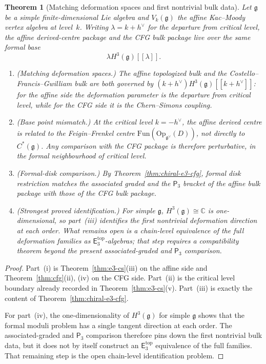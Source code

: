 \documentclass[11pt,reqno]{amsart}
\newtheorem{theorem}{Theorem}[section]
\theoremstyle{definition}
\theoremstyle{remark}
\providecommand{\Ethree}{\mathsf{E}_{3}}
\newcommand{\Pthree}{\mathsf{P}_{3}}
\newcommand{\fg}{\mathfrak{g}}
\newcommand{\CC}{\mathbb{C}}
\numberwithin{equation}{section}
\begin{document}
\begin{theorem}[Matching deformation spaces and first
nontrivial bulk data]
\label{thm:e3-identification}
Let $\fg$ be a simple finite-dimensional Lie algebra and
$V_k(\fg)$ the affine Kac--Moody vertex algebra at
level~$k$. Writing $\lambda = k + h^\vee$ for the
departure from critical level, the affine derived-centre
package and the CFG bulk package live over the same formal
base
\begin{equation}\label{eq:e3-families}
  \lambda H^3(\fg)[[\lambda]].
\end{equation}
\begin{enumerate}[label=\textup{(\roman*)}]
\item \textup{(Matching deformation spaces.)}
  The affine topologized bulk and the
  Costello--Francis--Gwilliam bulk are both governed by
  $(k+h^\vee) H^3(\fg)[[k+h^\vee]]$: for the affine side the
  deformation parameter is the departure from critical
  level, while for the CFG side it is the
  Chern--Simons coupling.
\item \textup{(Base point mismatch.)}
  At the critical level $k = -h^\vee$, the affine derived
  centre is related to the Feigin--Frenkel centre
  $\mathrm{Fun}(\mathrm{Op}_{\fg^\vee}(D))$, not directly to
  $C^*(\fg)$. Any comparison with the CFG package is
  therefore perturbative, in the formal neighbourhood of
  critical level.
\item \textup{(Formal-disk comparison.)}
  By Theorem~\textup{\ref{thm:chiral-e3-cfg}}, formal disk
  restriction matches the associated graded and the
  $\Pthree$ bracket of the affine bulk package with those of
  the CFG bulk package.
\item \textup{(Strongest proved identification.)}
  For simple $\fg$, $H^3(\fg) \cong \CC$ is one-dimensional,
  so part~\textup{(iii)} identifies the first nontrivial
  deformation direction at each order. What remains open is
  a chain-level equivalence of the full deformation
  families as $\Ethree^{\mathrm{top}}$-algebras; that step
  requires a compatibility theorem beyond the present
  associated-graded and $\Pthree$ comparison.
\end{enumerate}
\end{theorem}

\begin{proof}
Part~\textup{(i)} is Theorem~\ref{thm:e3-cs}\textup{(iii)}
on the affine side and Theorem~\ref{thm:cfg}\textup{(ii),
(iv)} on the CFG side. Part~\textup{(ii)} is the critical
level boundary already recorded in
Theorem~\ref{thm:e3-cs}\textup{(v)}. Part~\textup{(iii)} is
exactly the content of Theorem~\ref{thm:chiral-e3-cfg}.

For part~\textup{(iv)}, the one-dimensionality of
$H^3(\fg)$ for simple $\fg$ shows that the formal moduli
problem has a single tangent direction at each order. The
associated-graded and $\Pthree$ comparison therefore pins
down the first nontrivial bulk data, but it does not by
itself construct an $\Ethree^{\mathrm{top}}$ equivalence of
the full families. That remaining step is the open
chain-level identification problem.
\end{proof}
\end{document}
